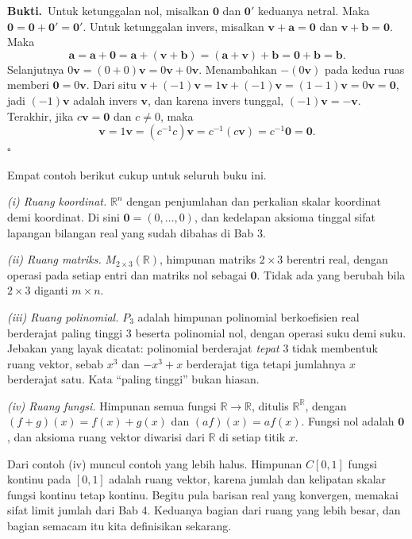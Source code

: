 \par\medskip\noindent\textbf{Bukti.}\ 
Untuk ketunggalan nol, misalkan $\mathbf{0}$ dan $\mathbf{0}'$ keduanya netral. Maka
$\mathbf{0}=\mathbf{0}+\mathbf{0}'=\mathbf{0}'$. Untuk ketunggalan invers, misalkan
$\mathbf{v}+\mathbf{a}=\mathbf{0}$ dan $\mathbf{v}+\mathbf{b}=\mathbf{0}$. Maka
\[
  \mathbf{a}=\mathbf{a}+\mathbf{0}=\mathbf{a}+(\mathbf{v}+\mathbf{b})
  =(\mathbf{a}+\mathbf{v})+\mathbf{b}=\mathbf{0}+\mathbf{b}=\mathbf{b}.
\]
Selanjutnya $0\mathbf{v}=(0+0)\mathbf{v}=0\mathbf{v}+0\mathbf{v}$. Menambahkan
$-(0\mathbf{v})$ pada kedua ruas memberi $\mathbf{0}=0\mathbf{v}$. Dari situ
$\mathbf{v}+(-1)\mathbf{v}=1\mathbf{v}+(-1)\mathbf{v}=(1-1)\mathbf{v}=0\mathbf{v}=\mathbf{0}$,
jadi $(-1)\mathbf{v}$ adalah invers $\mathbf{v}$, dan karena invers tunggal,
$(-1)\mathbf{v}=-\mathbf{v}$. Terakhir, jika $c\mathbf{v}=\mathbf{0}$ dan $c\neq 0$, maka
\[
  \mathbf{v}=1\mathbf{v}=(c^{-1}c)\mathbf{v}=c^{-1}(c\mathbf{v})=c^{-1}\mathbf{0}=\mathbf{0}.
\]
\hfill$\square$\par\medskip

Empat contoh berikut cukup untuk seluruh buku ini.

\emph{(i) Ruang koordinat.} $\mathbb{R}^{n}$ dengan penjumlahan dan perkalian skalar
koordinat demi koordinat. Di sini $\mathbf{0}=(0,\dots,0)$, dan kedelapan aksioma tinggal
sifat lapangan bilangan real yang sudah dibahas di Bab 3.

\emph{(ii) Ruang matriks.} $M_{2\times3}(\mathbb{R})$, himpunan matriks $2\times3$ berentri
real, dengan operasi pada setiap entri dan matriks nol sebagai $\mathbf{0}$. Tidak ada yang
berubah bila $2\times3$ diganti $m\times n$.

\emph{(iii) Ruang polinomial.} $P_{3}$ adalah himpunan polinomial berkoefisien real
berderajat paling tinggi $3$ beserta polinomial nol, dengan operasi suku demi suku. Jebakan
yang layak dicatat: polinomial berderajat \emph{tepat} $3$ tidak membentuk ruang vektor, sebab
$x^{3}$ dan $-x^{3}+x$ berderajat tiga tetapi jumlahnya $x$ berderajat satu. Kata ``paling
tinggi'' bukan hiasan.

\emph{(iv) Ruang fungsi.} Himpunan semua fungsi $\mathbb{R}\to\mathbb{R}$, ditulis
$\mathbb{R}^{\mathbb{R}}$, dengan $(f+g)(x)=f(x)+g(x)$ dan $(af)(x)=af(x)$. Fungsi nol adalah
$\mathbf{0}$, dan aksioma ruang vektor diwarisi dari $\mathbb{R}$ di setiap titik $x$.

Dari contoh (iv) muncul contoh yang lebih halus. Himpunan $C[0,1]$ fungsi kontinu pada
$[0,1]$ adalah ruang vektor, karena jumlah dan kelipatan skalar fungsi kontinu tetap kontinu.
Begitu pula barisan real yang konvergen, memakai sifat limit jumlah dari Bab 4. Keduanya
bagian dari ruang yang lebih besar, dan bagian semacam itu kita definisikan sekarang.

